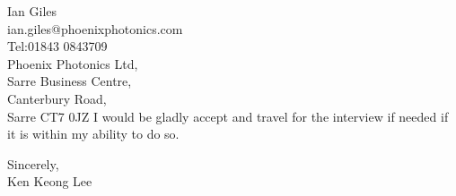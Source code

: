 \documentclass[11pt]{letter} %
\begin{document}
\begin{letter}{Ian Giles\\ian.giles@phoenixphotonics.com\\Tel:01843 0843709\\Phoenix Photonics Ltd,\\Sarre Business Centre,\\Canterbury Road,\\Sarre CT7 0JZ}
I would be gladly accept and travel for the interview if needed if it is within my ability to do so.



\closing{Sincerely,\\Ken Keong Lee}




\end{letter}
\end{document}

